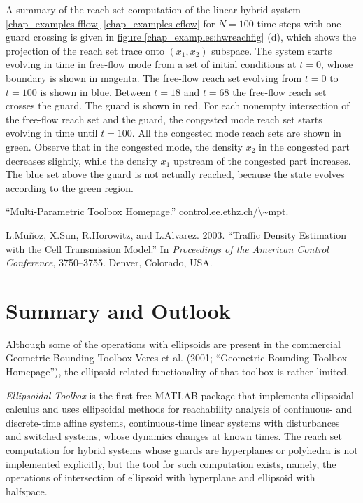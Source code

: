 \documentclass[letterpaper,10pt,english]{sphinxmanual}
\begin{document}
A summary of the reach set computation of the linear hybrid system
\eqref{chap_examples-fflow}-\eqref{chap_examples-cflow} for $N=100$ time steps with one guard crossing
is given in \hyperref[chap_examples:hwreachfig]{figure  \ref*{chap_examples:hwreachfig}} (d), which shows the projection of the
reach set trace onto $(x_1,x_2)$ subspace. The system starts
evolving in time in free-flow mode from a set of initial conditions at
$t=0$, whose boundary is shown in magenta. The free-flow reach set
evolving from $t=0$ to $t=100$ is shown in blue. Between
$t=18$ and $t=68$ the free-flow reach set crosses the guard.
The guard is shown in red. For each nonempty intersection of the
free-flow reach set and the guard, the congested mode reach set starts
evolving in time until $t=100$. All the congested mode reach sets
are shown in green. Observe that in the congested mode, the density
$x_2$ in the congested part decreases slightly, while the density
$x_1$ upstream of the congested part increases. The blue set above
the guard is not actually reached, because the state evolves according
to the green region.

“Multi-Parametric Toolbox Homepage.” control.ee.ethz.ch/\textbackslash{}\textasciitilde{}mpt.

L.Muñoz, X.Sun, R.Horowitz, and L.Alvarez. 2003. “Traffic Density
Estimation with the Cell Transmission Model.” In \emph{Proceedings of the
American Control Conference}, 3750–3755. Denver, Colorado, USA.


\chapter{Summary and Outlook}
\label{chap_summary::doc}\label{chap_summary:summary-and-outlook}
Although some of the operations with ellipsoids are present in the
commercial Geometric Bounding Toolbox Veres et al. (2001; “Geometric
Bounding Toolbox Homepage”), the ellipsoid-related functionality of that
toolbox is rather limited.

\emph{Ellipsoidal Toolbox} is the first free MATLAB package that implements
ellipsoidal calculus and uses ellipsoidal methods for reachability
analysis of continuous- and discrete-time affine systems,
continuous-time linear systems with disturbances and switched systems,
whose dynamics changes at known times. The reach set computation for
hybrid systems whose guards are hyperplanes or polyhedra is not
implemented explicitly, but the tool for such computation exists,
namely, the operations of intersection of ellipsoid with hyperplane and
ellipsoid with halfspace.
\end{document}
